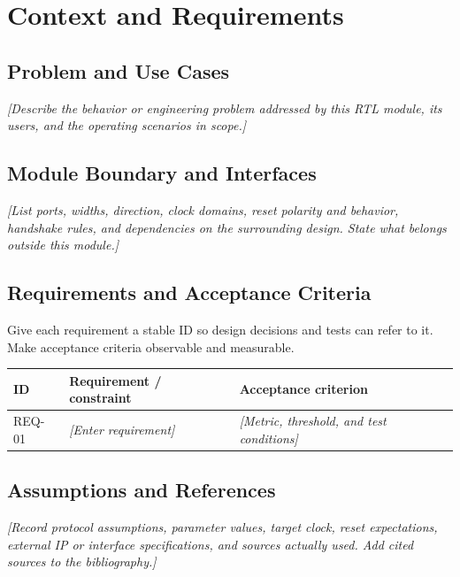 \chapter{Context and Requirements}

\section{Problem and Use Cases}
\textit{[Describe the behavior or engineering problem addressed by this RTL module, its users, and the operating scenarios in scope.]}

\section{Module Boundary and Interfaces}
\textit{[List ports, widths, direction, clock domains, reset polarity and behavior, handshake rules, and dependencies on the surrounding design. State what belongs outside this module.]}


\section{Requirements and Acceptance Criteria}
Give each requirement a stable ID so design decisions and tests can refer to it. Make acceptance criteria observable and measurable.

\begin{tabularx}{\textwidth}{@{}p{17mm}X X@{}}
  \toprule
  ID & Requirement / constraint & Acceptance criterion \\
  \midrule
  REQ-01 & \textit{[Enter requirement]} & \textit{[Metric, threshold, and test conditions]} \\
  \bottomrule
\end{tabularx}

\section{Assumptions and References}
\textit{[Record protocol assumptions, parameter values, target clock, reset expectations, external IP or interface specifications, and sources actually used. Add cited sources to the bibliography.]}
